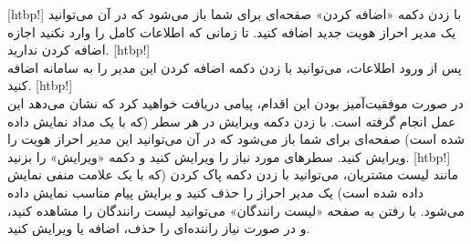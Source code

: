 	[htbp!]
\newpage
		 با زدن دکمه «اضافه کردن» صفحه‌ای برای شما باز می‌شود که در آن می‌توانید یک مدیر احراز هویت جدید اضافه کنید. تا زمانی که اطلاعات کامل را وارد نکنید اجازه اضافه کردن ندارید.
[htbp!]
\\
پس از ورود اطلاعات، می‌توانید با زدن دکمه اضافه کردن این مدیر را به سامانه اضافه کنید.
[htbp!]
\\
در صورت موفقیت‌آمیز بودن این اقدام، پیامی دریافت خواهید کرد که نشان می‌دهد این عمل انجام گرفته است.
 با زدن دکمه ویرایش در هر سطر (که با یک مداد نمایش داده شده است) صفحه‌ای برای شما باز می‌شود که در آن می‌توانید این مدیر احراز هویت را ویرایش کنید. سطرهای مورد نیاز را ویرایش کنید و دکمه «ویرایش» را بزنید.
[htbp!]
	 مانند لیست مشتریان، می‌توانید با زدن دکمه پاک کردن (که با یک علامت منفی نمایش داده شده است) یک مدیر احراز را حذف کنید و برایش پیام مناسب نمایش داده می‌شود.
	 با رفتن به صفحه «لیست رانندگان» می‌توانید لیست رانندگان را مشاهده کنید، و در صورت نیاز راننده‌ای را حذف، اضافه یا ویرایش کنید.

